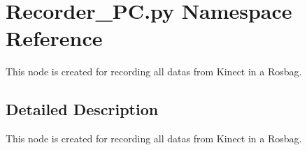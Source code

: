 \hypertarget{namespaceRecorder__PC_1_1py}{}\section{Recorder\+\_\+\+P\+C.\+py Namespace Reference}
\label{namespaceRecorder__PC_1_1py}


This node is created for recording all datas from Kinect in a Rosbag.  




\subsection{Detailed Description}
This node is created for recording all datas from Kinect in a Rosbag. 

